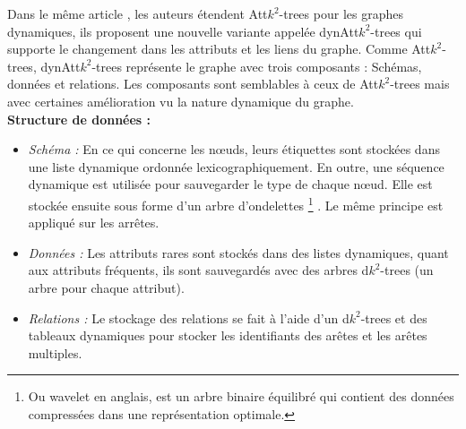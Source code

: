 Dans le même article \citep{alvarez2018compact}, les auteurs étendent Att$k^2$-trees pour les graphes dynamiques, ils proposent une nouvelle variante appelée dynAtt$k^2$-trees qui supporte le changement dans les attributs et les liens du graphe. Comme Att$k^2$-trees, dynAtt$k^2$-trees représente le graphe avec trois composants : Schémas, données et relations. Les composants sont semblables à ceux de Att$k^2$-trees mais avec certaines amélioration vu la nature dynamique du graphe.\\
\textbf{Structure de données : } 
\begin{itemize}
\item \textit{Schéma :}  En ce qui concerne les nœuds, leurs étiquettes sont stockées dans une liste dynamique ordonnée lexicographiquement. En outre, une séquence dynamique est utilisée pour sauvegarder le type de chaque nœud. Elle est stockée ensuite sous forme d'un arbre d'ondelettes \footnote{Ou wavelet en anglais, est un arbre binaire équilibré qui contient des données compressées dans une représentation optimale.} \citep{grossi2003high}. Le même principe est appliqué sur les arrêtes. 
\item \textit{Données :} Les attributs rares sont stockés dans des listes dynamiques, quant aux attributs fréquents, ils sont sauvegardés avec des arbres d$k^2$-trees (un arbre pour chaque attribut).
\item \textit{Relations :} Le stockage des relations se fait à l'aide d'un d$k^2$-trees et des tableaux dynamiques pour stocker les identifiants des arêtes et les arêtes multiples.
\end{itemize}





























